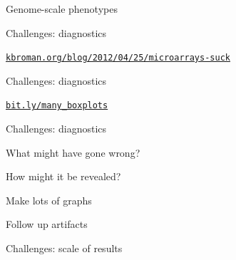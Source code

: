 \documentclass[12pt,t]{beamer}
\begin{document}
\begin{frame}[c]{Genome-scale phenotypes}


\end{frame}



\begin{frame}{Challenges: {\color{foreground} diagnostics}}

\vspace{2mm}


\vspace{3mm}

\hfill \href{http://kbroman.org/blog/2012/04/25/microarrays-suck}{\scriptsize \lolit \tt kbroman.org/blog/2012/04/25/microarrays-suck}

\end{frame}


\begin{frame}{Challenges: {\color{foreground} diagnostics}}

  \vspace{8mm}


\vspace{3mm}

\hfill
\href{https://bit.ly/many_boxplots}{\scriptsize
  \lolit \tt bit.ly/many\_boxplots}

\end{frame}


\begin{frame}[c]{Challenges: {\color{foreground} diagnostics}}

\vspace{-20mm}

  \bbi
\item What might have gone wrong?
\item How might it be revealed?
\item Make lots of graphs
\item Follow up artifacts
  \ei

\end{frame}


\begin{frame}[c]{Challenges: {\color{foreground} scale of results}}


\end{frame}
\end{document}
